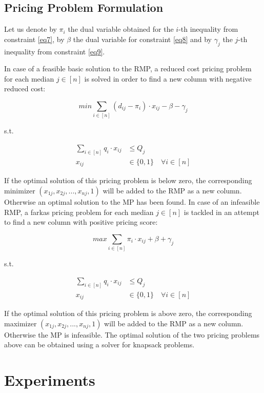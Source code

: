 \documentclass[
	11pt,
	DIV10,
	ngerman,
	a4paper,
	oneside,
	headings=normal,
	captions=tableheading,
	final,
	numbers=noenddot
]{scrartcl}
\begin{document}
\subsection{Pricing Problem Formulation}

Let us denote by $ \pi_{i} $ the dual variable obtained for the $ i $-th inequality from constraint \eqref{eq7}, by $ \beta $ the dual variable for constraint \eqref{eq8} and by $ \gamma_{j} $ the $ j $-th inequality from constraint \eqref{eq9}.

In case of a feasible basic solution to the RMP, a reduced cost pricing problem for each median $ j \in [n]$ is solved in order to find a new column with negative reduced cost:

\begin{equation}
	min \sum_{i \in [n]} (d_{ij} - \pi_{i}) \cdot x_{ij} - \beta - \gamma_{j}
\end{equation}

s.t.

\begin{align}
	\sum_{i \in [n]} q_{i} \cdot x_{ij} &\leq Q_{j} \\[1em]
	x_{ij} &\in \{0, 1\} \quad \forall i \in [n] \nonumber
\end{align}

If the optimal solution of this pricing problem is below zero, the corresponding minimizer $ (x_{1j}, x_{2j}, ..., x_{nj}, 1) $ will be added to the RMP as a new column. Otherwise an optimal solution to the MP has been found. In case of an infeasible RMP, a farkas pricing problem for each median $ j \in [n]$ is tackled in an attempt to find a new column with positive pricing score:

\begin{equation}
	max \sum_{i \in [n]} \pi_{i} \cdot x_{ij} + \beta + \gamma_{j}
\end{equation}

s.t.

\begin{align}
	\sum_{i \in [n]} q_{i} \cdot x_{ij} &\leq Q_{j} \\[1em]
	x_{ij} &\in \{0, 1\} \quad \forall i \in [n] \nonumber
\end{align}

If the optimal solution of this pricing problem is above zero, the corresponding maximizer $ (x_{1j}, x_{2j}, ..., x_{nj}, 1) $ will be added to the RMP as a new column. Otherwise the MP is infeasible. The optimal solution of the two pricing problems above can be obtained using a solver for knapsack problems.

\section{Experiments}
\label{sec2}



\end{document}
